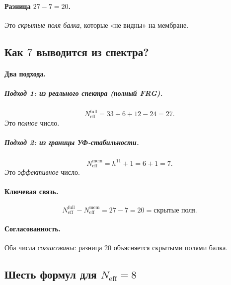 \documentclass[11pt,a4paper]{article}
\newcommand{\Neff}{N_{\text{eff}}}
\theoremstyle{definition}
\begin{document}
\paragraph{Разница $27 - 7 = 20$.}
Это \emph{скрытые поля балка}, которые «не видны» на мембране.

\subsection{Как $7$ выводится из спектра?}
\label{subsec:how-7-derived}

\paragraph{Два подхода.}

\subparagraph{Подход 1: из реального спектра (полный FRG).}
\begin{equation}
    \Neff^{\text{full}} = 33 + 6 + 12 - 24 = 27.
\end{equation}
Это \emph{полное} число.

\subparagraph{Подход 2: из границы УФ-стабильности.}
\begin{equation}
    \Neff^{\text{mem}} = h^{11} + 1 = 6 + 1 = 7.
\end{equation}
Это \emph{эффективное} число.

\paragraph{Ключевая связь.}
\begin{equation}
    \boxed{
    \Neff^{\text{full}} - \Neff^{\text{mem}} = 27 - 7 = 20 
    = \text{скрытые поля}.
    }
\end{equation}

\paragraph{Согласованность.}
Оба числа \emph{согласованы}: разница $20$ объясняется 
скрытыми полями балка.

\subsection{Шесть формул для $\Neff = 8$}
\label{subsec:six-formulas-neff}
\end{document}
